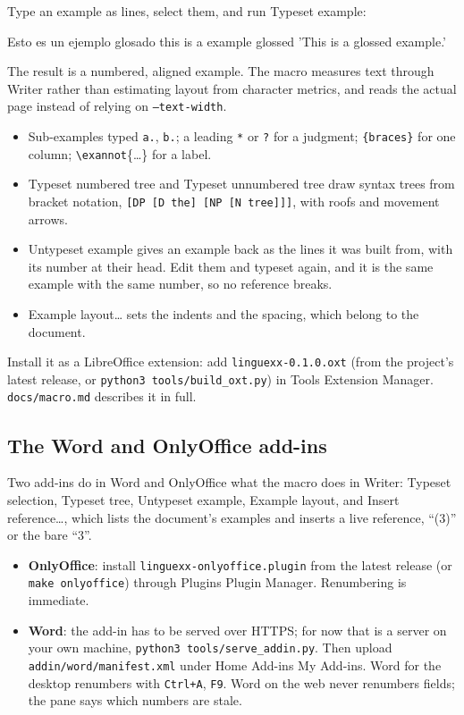 \documentclass[11pt,a4paper]{article}
\newcommand{\cs}[1]{\texttt{\textbackslash #1}}
\newcommand{\opt}[1]{\texttt{#1}}
\newcommand{\file}[1]{\texttt{#1}}
\newcommand{\menu}[1]{\textsf{#1}}
\begin{document}
Type an example as lines, select them, and run \menu{Typeset example}:
\begin{code}
Esto es un ejemplo glosado
this is a example glossed
'This is a glossed example.'
\end{code}
The result is a numbered, aligned example. The macro measures text through Writer rather than estimating layout from
character metrics, and reads the actual page instead of relying on
\opt{--text-width}.
\begin{itemize}[nosep]
\item Sub-examples typed \texttt{a.}, \texttt{b.}; a leading \texttt{*} or
  \texttt{?} for a judgment; \texttt{\{braces\}} for one column;
  \cs{exannot}\{\ldots\} for a label.
\item \menu{Typeset numbered tree} and \menu{Typeset unnumbered tree} draw
  syntax trees from bracket notation, \texttt{[DP [D the] [NP [N tree]]]},
  with roofs and movement arrows.
\item \menu{Untypeset example} gives an example back as the lines it was
  built from, with its number at their head. Edit them and typeset again,
  and it is the same example with the same number, so no reference breaks.
\item \menu{Example layout\ldots} sets the indents and the spacing, which
  belong to the document.
\end{itemize}
Install it as a LibreOffice extension: add \file{linguexx-0.1.0.oxt} (from
the project's latest release, or \texttt{python3 tools/build\_oxt.py}) in
\menu{Tools \textrightarrow{} Extension Manager}. \file{docs/macro.md}
describes it in full.

\subsection{The Word and OnlyOffice add-ins}

Two add-ins do in Word and OnlyOffice what the macro does in Writer:
\menu{Typeset selection}, \menu{Typeset tree}, \menu{Untypeset example},
\menu{Example layout}, and \menu{Insert reference\ldots}, which lists the
document's examples and inserts a live reference, ``(3)'' or the bare
``3''.
\begin{itemize}
\item \textbf{OnlyOffice}: install \file{linguexx-onlyoffice.plugin} from
  the latest release (or \texttt{make onlyoffice}) through \menu{Plugins
  \textrightarrow{} Plugin Manager}. Renumbering is immediate.
\item \textbf{Word}: the add-in has to be served over HTTPS; for now that is
  a server on your own machine, \texttt{python3 tools/serve\_addin.py}. Then
  upload \file{addin/word/manifest.xml} under \menu{Home \textrightarrow{}
  Add-ins \textrightarrow{} My Add-ins}. Word for the desktop renumbers with
  \texttt{Ctrl+A}, \texttt{F9}. Word on the web never renumbers fields;
  the pane says which numbers are stale.
\end{itemize}
\end{document}
